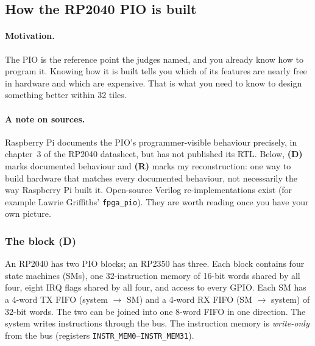 \subsection{How the RP2040 PIO is built}\label{sec:pio}

\paragraph{Motivation.} The PIO is the reference point the judges named, and
you already know how to program it. Knowing how it is built tells you which
of its features are nearly free in hardware and which are expensive. That
is what you need to know to design something better within 32 tiles.

\paragraph{A note on sources.} Raspberry Pi documents the PIO's
programmer-visible behaviour precisely, in chapter~3 of the RP2040 datasheet,
but has not published its RTL. Below, \textbf{(D)} marks documented behaviour
and \textbf{(R)} marks my reconstruction: one way to build hardware that
matches every documented behaviour, not necessarily the way Raspberry Pi
built it. Open-source Verilog re-implementations exist (for example Lawrie
Griffiths' \texttt{fpga\_pio}). They are worth reading once you have your own
picture.

\subsubsection{The block (D)}

An RP2040 has two PIO blocks; an RP2350 has three. Each block contains four
state machines (SMs), one 32-instruction memory of 16-bit words shared by
all four, eight IRQ flags shared by all four, and access to every GPIO.
Each SM has a 4-word TX FIFO (system $\to$ SM) and a 4-word RX FIFO
(SM $\to$ system) of 32-bit words. The two can be joined into one 8-word
FIFO in one direction. The system writes instructions through the bus. The
instruction memory is \emph{write-only} from the bus (registers
\texttt{INSTR\_MEM0}--\texttt{INSTR\_MEM31}).

